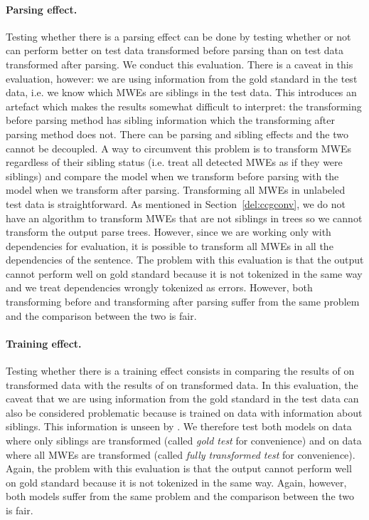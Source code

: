 \documentclass[output=paper]{langsci/langscibook}
\begin{document}
    \paragraph*{Parsing effect.}
    Testing whether there is a parsing effect can be done by testing whether or not {\modelA} can perform better on test data transformed before parsing than on test data transformed after parsing. We conduct this evaluation. There is a caveat in this evaluation, however: we are using information from the gold standard in the test data, i.e. we know which MWEs are siblings in the test data. This introduces an artefact which makes the results somewhat difficult to interpret: the transforming before parsing method has sibling information which the transforming after parsing method does not. There can be parsing and sibling effects and the two cannot be decoupled. A way to circumvent this problem is to transform MWEs regardless of their sibling status (i.e. treat all detected MWEs as if they were siblings) and compare the model when we transform before parsing with the model when we transform after parsing. Transforming all MWEs in unlabeled test data is straightforward. As mentioned in Section~\ref{del:ccgconv}, we do not have an algorithm to transform MWEs that are not siblings in trees so we cannot transform the output parse trees. However, since we are working only with dependencies for evaluation, it is possible to transform all MWEs in all the dependencies of the sentence. The problem with this evaluation is that the output cannot perform well on gold standard because it is not tokenized in the same way and we treat dependencies wrongly tokenized as errors. However, both transforming before and transforming after parsing suffer from the same problem and the comparison between the two is fair. 
    \paragraph*{Training effect.}
    Testing whether there is a training effect consists in comparing the results of {\modelA} on transformed data with the results of {\modelB} on transformed data. In this evaluation, the caveat that we are using information from the gold standard in the test data can also be considered problematic because {\modelB} is trained on data with information about siblings. This information is unseen by {\modelA}. We therefore test both models on data where only siblings are transformed (called \textit{gold test} for convenience) and on data where all MWEs are transformed (called \textit{fully transformed test} for convenience). Again, the problem with this evaluation is that the output cannot perform well on gold standard because it is not tokenized in the same way. Again, however, both models suffer from the same problem and the comparison between the two is fair.
\end{document}
